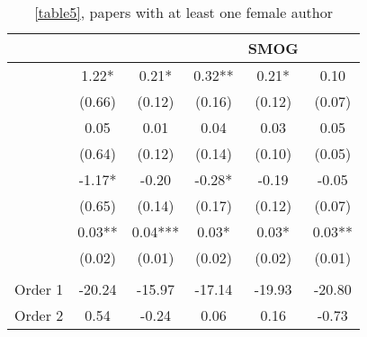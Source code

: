 \begin{table}
    \footnotesize
    \centering
    \begin{threeparttable}
        \caption{\autoref{table5}, papers with at least one female author}
        \label{tableC5a}
        \begin{tabular}{p{4cm}S@{}S@{}S@{}S@{}S@{}}
            \toprule
            &{}&{}&{}&{SMOG}&{}\\
            \midrule
            &        1.22*  &        0.21*  &        0.32** &        0.21*  &        0.10   \\
                                          &      (0.66)   &      (0.12)   &      (0.16)   &      (0.12)   &      (0.07)   \\
            &        0.05   &        0.01   &        0.04   &        0.03   &        0.05   \\
                                          &      (0.64)   &      (0.12)   &      (0.14)   &      (0.10)   &      (0.05)   \\
            &       -1.17*  &       -0.20   &       -0.28*  &       -0.19   &       -0.05   \\
                                          &      (0.65)   &      (0.14)   &      (0.17)   &      (0.12)   &      (0.07)   \\
                  &        0.03** &        0.04***&        0.03*  &        0.03*  &        0.03** \\
                                          &      (0.02)   &      (0.01)   &      (0.02)   &      (0.02)   &      (0.01)   \\
             \\
            Order 1&      -20.24   &      -15.97   &      -17.14   &      -19.93   &      -20.80   \\
            Order 2                       &        0.54   &       -0.24   &        0.06   &        0.16   &       -0.73   \\
            \midrule

\end{tabular}
\end{threeparttable}
\end{table}
